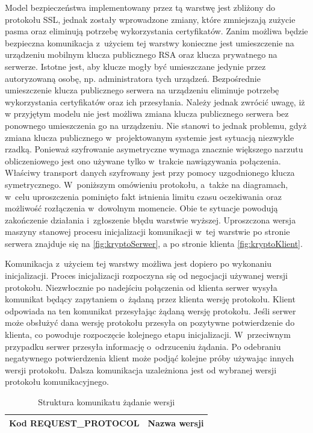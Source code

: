 Model bezpieczeństwa implementowany przez tą warstwę jest zbliżony do
protokołu SSL, jednak zostały wprowadzone zmiany, które zmniejszają
zużycie pasma oraz eliminują potrzebę wykorzystania
certyfikatów. Zanim możliwa będzie bezpieczna komunikacja z~użyciem
tej warstwy konieczne jest umieszczenie na urządzeniu mobilnym klucza
publicznego RSA oraz klucza prywatnego na serwerze. Istotne jest, aby
klucze mogły być umieszczane jedynie przez autoryzowaną osobę,
np. administratora tych urządzeń. Bezpośrednie umieszczenie klucza
publicznego serwera na urządzeniu eliminuje potrzebę wykorzystania
certyfikatów oraz ich przesyłania. Należy jednak zwrócić uwagę, iż w
przyjętym modelu nie jest możliwa zmiana klucza publicznego serwera
bez ponownego umieszczenia go na urządzeniu. Nie stanowi to jednak
problemu, gdyż zmiana klucza publicznego w~projektowanym systemie jest
sytuacją niezwykle rzadką. Ponieważ szyfrowanie asymetryczne wymaga
znacznie większego narzutu obliczeniowego jest ono używane tylko
w~trakcie nawiązywania połączenia. Właściwy transport danych
szyfrowany jest przy pomocy uzgodnionego klucza
symetrycznego. W~poniższym omówieniu protokołu, a~także na diagramach,
w~celu uproszczenia pominięto fakt istnienia limitu czasu oczekiwania
oraz możliwość rozłączenia w~dowolnym momencie. Obie te sytuacje
powodują zakończenie działania i~zgłoszenie błędu warstwie
wyższej. Uproszczona wersja maszyny stanowej procesu inicjalizacji
komunikacji w~tej warstwie po stronie serwera znajduje się na
\ref{fig:kryptoSerwer}, a po stronie klienta \ref{fig:kryptoKlient}.

Komunikacja z~użyciem tej warstwy możliwa jest dopiero po wykonaniu
inicjalizacji. Proces inicjalizacji rozpoczyna się od negocjacji
używanej wersji protokołu. Niezwłocznie po nadejściu połączenia od
klienta serwer wysyła komunikat będący zapytaniem o~żądaną przez
klienta wersję protokołu. Klient odpowiada na ten komunikat
przesyłając żądaną wersję protokołu. Jeśli serwer może obsłużyć dana
wersję protokołu przesyła on pozytywne potwierdzenie do klienta, co
powoduje rozpoczęcie kolejnego etapu inicjalizacji. W~przeciwnym
przypadku serwer przesyła informację o~odrzuceniu żądania. Po
odebraniu negatywnego potwierdzenia klient może podjąć kolejne próby
używając innych wersji protokołu. Dalsza komunikacja uzależniona jest
od wybranej wersji protokołu komunikacyjnego.

\begin{table}[H]
\centering
\caption{Struktura komunikatu żądanie wersji}

\begin{tabular}{|p{5cm}|p{6cm}|}
\hline
\raggedright{Kod REQUEST\_PROTOCOL} & Nazwa wersji\\
\hline
\end{tabular}
\end{table}

